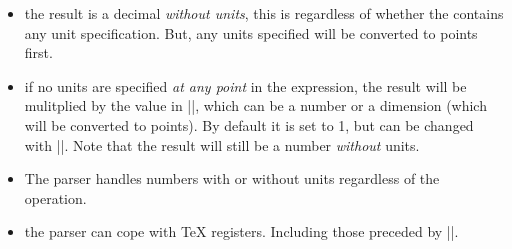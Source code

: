 	\begin{itemize}
	\item the result is a decimal \emph{without units}, this is 
	regardless of whether the  contains any unit 
	specification. But, any units specified will be converted to 
	points first.

\begin{codeexample}[post=\tt\footnotesize\pgfmathresult]
\pgfmathparse{2pt+3.4pt}
\end{codeexample}

\begin{codeexample}[post=\tt\footnotesize\pgfmathresult]
\pgfmathparse{2cm+3.4cm}
\end{codeexample}

	\item if no units are specified \emph{at any point} in the 
	expression, the result will be mulitplied by the value in 
	|\pgfmathresultunitscale|, which can be a number or a dimension 
	(which will be converted to points). By default it is set to 1, 
	but can be changed with |\pgfmathsetresultunitscale|. Note that 
	the result will still be a number \emph{without} units.

\begin{codeexample}[post=\tt\footnotesize\pgfmathresult]
\pgfmathparse{2pt+3.4pt}
\end{codeexample}

\begin{codeexample}[post=\tt\footnotesize\pgfmathresult]
\pgfmathsetresultunitscale{1cm}
\end{codeexample}

	\pgfmathsetresultunitscale{1pt}

	\item The parser handles numbers with or without units regardless
	of the operation.

\begin{codeexample}[post=\tt\footnotesize\pgfmathresult]
\end{codeexample}

	\item the parser can cope with \TeX{} registers. Including those 
	preceded by |\the|.

\begin{codeexample}[post=\tt\footnotesize\pgfmathresult]
\pgf@x=12.34pt
\end{codeexample}


\end{itemize}
